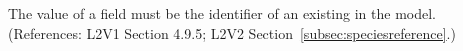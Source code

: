 The value of a \SpeciesReference {} field must be the
identifier of an existing \Species in the model.  (References: L2V1 Section
4.9.5; L2V2 Section~\ref{subsec:speciesreference}.)
